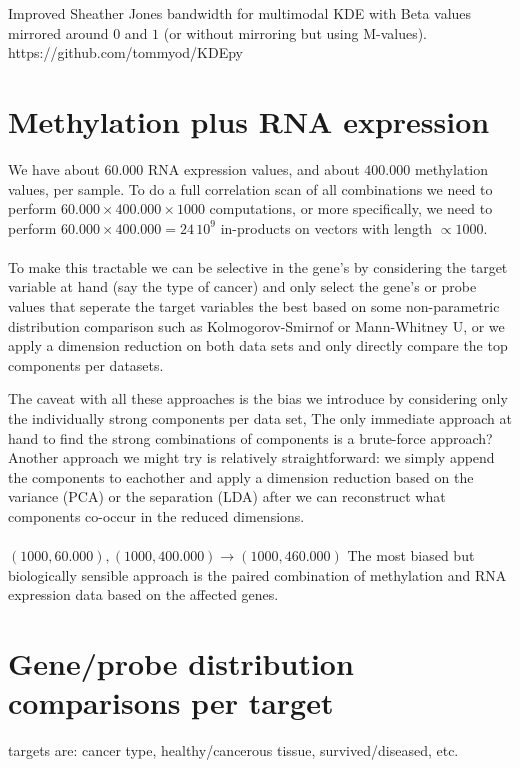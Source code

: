 \documentclass[a4paper,10pt]{article}
\begin{document}
Improved Sheather Jones bandwidth for multimodal KDE with Beta values mirrored around $0$ 
and $1$ (or without mirroring but using M-values). https://github.com/tommyod/KDEpy


\section{Methylation plus RNA expression}
%
We have about $60.000$ RNA expression values, and about $400.000$ methylation values, per sample.
To do a full correlation scan of all combinations we need to perform $60.000\times 400.000 \times 1000$ computations, 
or more specifically, we need to perform $60.000\times 400.000=24\,10^9$ in-products on vectors with length $\propto 1000$. \\ \\
%
To make this tractable we can be selective in the gene's by considering the target variable at hand (say the type 
of cancer) and only select the gene's or probe values that seperate the target variables the best based 
on some non-parametric distribution comparison such as Kolmogorov-Smirnof or Mann-Whitney U, or we apply 
a dimension reduction on both data sets and only directly compare  the top components per datasets.

The caveat with all these approaches is the bias we introduce by considering only the individually strong components per data set, 
The only immediate approach at hand to find the strong combinations of components is a brute-force approach?
Another approach we might try is relatively straightforward: we simply append the components to eachother and apply a
dimension reduction based on the variance (PCA) or the separation (LDA) after we can reconstruct what
components co-occur in the reduced dimensions. \\ \\
%
$(1000, 60.000),(1000, 400.000) \rightarrow (1000, 460.000)$
%
The most biased but biologically sensible approach is the paired combination of methylation and RNA expression data
based on the affected genes. 

\section{Gene/probe distribution comparisons per target}
%
targets are: cancer type, healthy/cancerous tissue, survived/diseased, etc.



 
\end{document}
